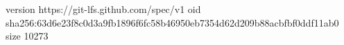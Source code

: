 version https://git-lfs.github.com/spec/v1
oid sha256:63d6e23f8c0d3a9fb1896f6fc58b46950eb7354d62d209b88acbfbf0ddf11ab0
size 10273
